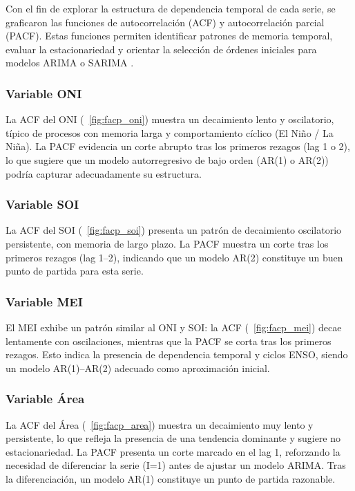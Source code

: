 Con el fin de explorar la estructura de dependencia temporal de cada serie, se graficaron 
las funciones de autocorrelación (ACF) y autocorrelación parcial (PACF). Estas funciones 
permiten identificar patrones de memoria temporal, evaluar la estacionariedad y orientar 
la selección de órdenes iniciales para modelos ARIMA o SARIMA \parencite{box2015time, hyndman2018forecasting}. 

\subsubsection{Variable ONI}

La ACF del ONI (~\ref{fig:facp_oni}) muestra un decaimiento lento y oscilatorio, típico de procesos con memoria 
larga y comportamiento cíclico (El Niño / La Niña). La PACF evidencia un corte abrupto 
tras los primeros rezagos (lag 1 o 2), lo que sugiere que un modelo autorregresivo de bajo 
orden (AR(1) o AR(2)) podría capturar adecuadamente su estructura.

\subsubsection{Variable SOI}

La ACF del SOI (~\ref{fig:facp_soi}) presenta un patrón de decaimiento oscilatorio persistente, con memoria de 
largo plazo. La PACF muestra un corte tras los primeros rezagos (lag 1–2), indicando que 
un modelo AR(2) constituye un buen punto de partida para esta serie.

\subsubsection{Variable MEI}

El MEI exhibe un patrón similar al ONI y SOI: la ACF (~\ref{fig:facp_mei}) decae lentamente con oscilaciones, 
mientras que la PACF se corta tras los primeros rezagos. Esto indica la presencia de 
dependencia temporal y ciclos ENSO, siendo un modelo AR(1)–AR(2) adecuado como 
aproximación inicial.

\subsubsection{Variable Área}

La ACF del Área (~\ref{fig:facp_area}) muestra un decaimiento muy lento y persistente, lo que refleja la 
presencia de una tendencia dominante y sugiere no estacionariedad. La PACF presenta un 
corte marcado en el lag 1, reforzando la necesidad de diferenciar la serie (I=1) antes de 
ajustar un modelo ARIMA. Tras la diferenciación, un modelo AR(1) constituye un punto de 
partida razonable.

